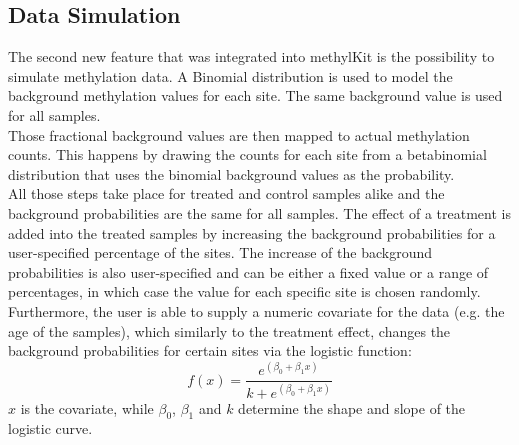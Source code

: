 \subsection{Data Simulation}

The second new feature that was integrated into methylKit is the possibility to simulate methylation data. A Binomial distribution is used to model the background methylation values for each site. The same background value is used for all samples.\\
Those fractional background values are then mapped to actual methylation counts. This happens by drawing the counts for each site from a betabinomial distribution that uses the binomial background values as the probability.\\
All those steps take place for treated and control samples alike and the background probabilities are the same for all samples.
The effect of a treatment is added into the treated samples by increasing the background probabilities for a user-specified percentage of the sites. The increase of the background probabilities is also user-specified and can be either a fixed value or a range of percentages, in which case the value for each specific site is chosen randomly.\\
Furthermore, the user is able to supply a numeric covariate for the data (e.g. the age of the samples), which similarly to the treatment effect, changes the background probabilities for certain sites via the logistic function:
\[f(x) = \frac{e^{(\beta_{0} + \beta_{1}x)}}{k+e^{(\beta_{0} + \beta_{1}x)}}\]
$x$ is the covariate, while $\beta_{0}$, $\beta_{1}$ and $k$ determine the shape and slope of the logistic curve.
  
  
  
  
  
  
  
  
  
  
  
  
  
